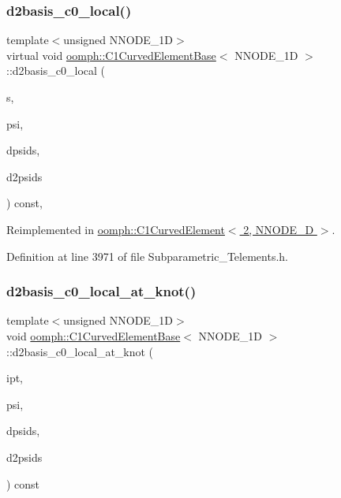 \subsubsection{\texorpdfstring{d2basis\+\_\+c0\+\_\+local()}{d2basis\_c0\_local()}}
{\footnotesize\ttfamily template$<$unsigned N\+N\+O\+D\+E\+\_\+1D$>$ \\
virtual void \hyperlink{classoomph_1_1C1CurvedElementBase}{oomph\+::\+C1\+Curved\+Element\+Base}$<$ N\+N\+O\+D\+E\+\_\+1D $>$\+::d2basis\+\_\+c0\+\_\+local (\begin{DoxyParamCaption}\item[{const \hyperlink{classoomph_1_1Vector}{Vector}$<$ double $>$ \&}]{s,  }\item[{\hyperlink{classoomph_1_1Shape}{Shape} \&}]{psi,  }\item[{\hyperlink{classoomph_1_1DShape}{D\+Shape} \&}]{dpsids,  }\item[{\hyperlink{classoomph_1_1DShape}{D\+Shape} \&}]{d2psids }\end{DoxyParamCaption}) const\hspace{0.3cm}{\ttfamily [inline]}, {\ttfamily [virtual]}}



Reimplemented in \hyperlink{classoomph_1_1C1CurvedElement_3_012_00_01NNODE__1D_01_4_a878207a94d904e0d954a45de2a626a0e}{oomph\+::\+C1\+Curved\+Element$<$ 2, N\+N\+O\+D\+E\+\_\+D $>$}.



Definition at line 3971 of file Subparametric\+\_\+\+Telements.\+h.

\mbox{\label{classoomph_1_1C1CurvedElementBase_a77dd032b44618de5e12187e88a1c7007}} 
\subsubsection{\texorpdfstring{d2basis\+\_\+c0\+\_\+local\+\_\+at\+\_\+knot()}{d2basis\_c0\_local\_at\_knot()}}
{\footnotesize\ttfamily template$<$unsigned N\+N\+O\+D\+E\+\_\+1D$>$ \\
void \hyperlink{classoomph_1_1C1CurvedElementBase}{oomph\+::\+C1\+Curved\+Element\+Base}$<$ N\+N\+O\+D\+E\+\_\+1D $>$\+::d2basis\+\_\+c0\+\_\+local\+\_\+at\+\_\+knot (\begin{DoxyParamCaption}\item[{const unsigned \&}]{ipt,  }\item[{\hyperlink{classoomph_1_1Shape}{Shape} \&}]{psi,  }\item[{\hyperlink{classoomph_1_1DShape}{D\+Shape} \&}]{dpsids,  }\item[{\hyperlink{classoomph_1_1DShape}{D\+Shape} \&}]{d2psids }\end{DoxyParamCaption}) const\hspace{0.3cm}{\ttfamily [inline]}}

